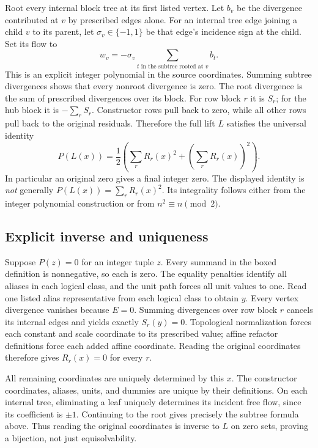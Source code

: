 Root every internal block tree at its first listed vertex. Let \(b_v\)
be the divergence contributed at \(v\) by prescribed edges alone.
For an internal tree edge joining a child \(v\) to its parent, let
\(\sigma_v\in\{-1,1\}\) be that edge's incidence sign at the child.
Set its flow to
\[
 w_v=-\sigma_v\sum_{t\text{ in the subtree rooted at }v}b_t.
\]
This is an explicit integer polynomial in the source coordinates. Summing
subtree divergences shows that every nonroot divergence is zero. The
root divergence is the sum of prescribed divergences over its block.
For row block \(r\) it is \(S_r\); for the hub block it is
\(-\sum_rS_r\). Constructor rows pull back to zero, while all other
rows pull back to the original residuals. Therefore the full lift \(L\)
satisfies the universal identity
\[
 P(L(x))=\frac12\left(\sum_rR_r(x)^2+
                                \left(\sum_rR_r(x)\right)^2\right).
\]
In particular an original zero gives a final integer zero. The displayed
identity is \emph{not} generally \(P(L(x))=\sum_rR_r(x)^2\).
Its integrality follows either from the integer polynomial construction
or from \(n^2\equiv n\pmod2\).

\subsection{Explicit inverse and uniqueness}
Suppose \(P(z)=0\) for an integer tuple \(z\). Every summand in the
boxed definition is nonnegative, so each is zero. The equality penalties
identify all aliases in each logical class, and the unit path forces all
unit values to one. Read one listed alias representative from each
logical class to obtain \(y\). Every vertex divergence vanishes because
\(E=0\). Summing divergences over row block \(r\) cancels its internal
edges and yields exactly \(S_r(y)=0\). Topological normalization forces
each constant and scale coordinate to its prescribed value; affine
refactor definitions force each added affine coordinate. Reading the
original coordinates therefore gives \(R_r(x)=0\) for every \(r\).

All remaining coordinates are uniquely determined by this \(x\). The
constructor coordinates, aliases, units, and dummies are unique by their
definitions. On each internal tree, eliminating a leaf uniquely determines
its incident free flow, since its coefficient is \(\pm1\). Continuing
to the root gives precisely the subtree formula above. Thus reading the
original coordinates is inverse to \(L\) on zero sets, proving a
bijection, not just equisolvability.

